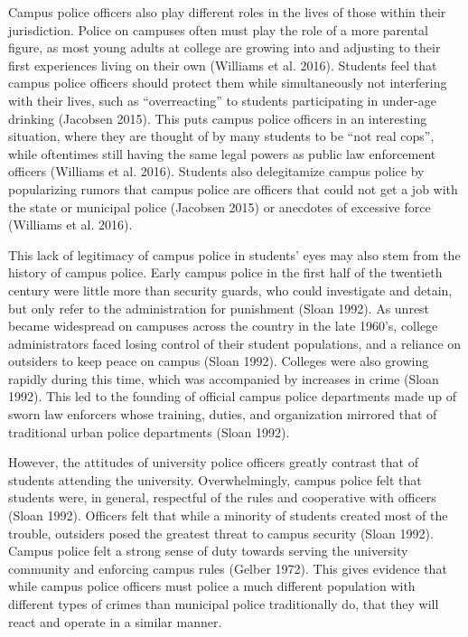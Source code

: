 \documentclass{ucetd}
\begin{document}
Campus police officers also play different roles in the lives of those
within their jurisdiction. Police on campuses often must play the role
of a more parental figure, as most young adults at college are growing
into and adjusting to their first experiences living on their own
(Williams et al. 2016). Students feel that campus police officers should
protect them while simultaneously not interfering with their lives, such
as ``overreacting'' to students participating in under-age drinking
(Jacobsen 2015). This puts campus police officers in an interesting
situation, where they are thought of by many students to be ``not real
cops'', while oftentimes still having the same legal powers as public
law enforcement officers (Williams et al. 2016). Students also
delegitamize campus police by popularizing rumors that campus police are
officers that could not get a job with the state or municipal police
(Jacobsen 2015) or anecdotes of excessive force (Williams et al. 2016).

This lack of legitimacy of campus police in students' eyes may also stem
from the history of campus police. Early campus police in the first half
of the twentieth century were little more than security guards, who
could investigate and detain, but only refer to the administration for
punishment (Sloan 1992). As unrest became widespread on campuses across
the country in the late 1960's, college administrators faced losing
control of their student populations, and a reliance on outsiders to
keep peace on campus (Sloan 1992). Colleges were also growing rapidly
during this time, which was accompanied by increases in crime (Sloan
1992). This led to the founding of official campus police departments
made up of sworn law enforcers whose training, duties, and organization
mirrored that of traditional urban police departments (Sloan 1992).

However, the attitudes of university police officers greatly contrast
that of students attending the university. Overwhelmingly, campus police
felt that students were, in general, respectful of the rules and
cooperative with officers (Sloan 1992). Officers felt that while a
minority of students created most of the trouble, outsiders posed the
greatest threat to campus security (Sloan 1992). Campus police felt a
strong sense of duty towards serving the university community and
enforcing campus rules (Gelber 1972). This gives evidence that while
campus police officers must police a much different population with
different types of crimes than municipal police traditionally do, that
they will react and operate in a similar manner.
\end{document}
